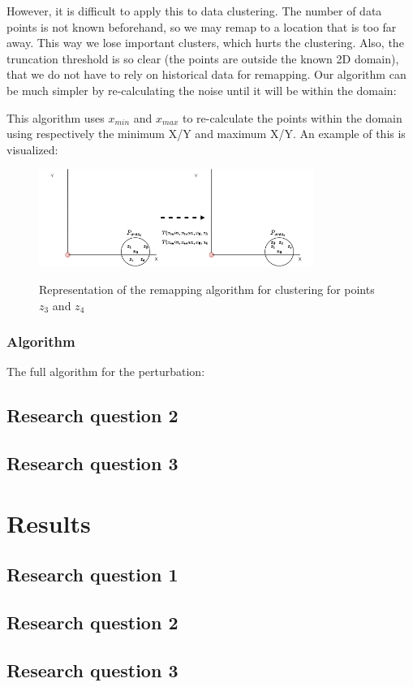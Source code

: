 However, it is difficult to apply this to data clustering.
The number of data points is not known beforehand, so we may remap to a location that is too far away.
This way we lose important clusters, which hurts the clustering.
Also, the truncation threshold is so clear (the points are outside the known 2D domain), that we do not have to rely on historical data for remapping.
Our algorithm can be much simpler by re-calculating the noise until it will be within the domain:

This algorithm uses $x_{min}$ and $x_{max}$ to re-calculate the points within the domain using respectively the minimum X/Y and maximum X/Y.
An example of this is visualized:
\begin{figure}[h]
  \includegraphics[width=0.8\textwidth]{Method/images/truncation-rq1.png}
  \label{fig:truncation}
  \centering
  \caption{Representation of the remapping algorithm for clustering for points $z_3$ and $z_4$ }
\end{figure}
\newpage
\subsubsection{Algorithm}
The full algorithm for the perturbation:


\subsection{Research question 2}
\subsection{Research question 3}
\section{Results}
\subsection{Research question 1}
\subsection{Research question 2}
\subsection{Research question 3}